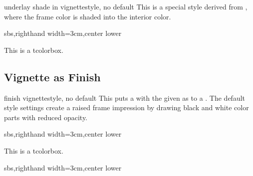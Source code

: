\begin{docTcbKey}[][doc new=2016-04-22]{underlay shade in vignette}{}{style, no default}
  This is a special style derived from ,
  where the frame color is shaded into the interior color.
\begin{dispExample*}{sbs,righthand width=3cm,center lower}
\begin{tcolorbox}[enhanced,sharp corners,frame hidden,
  colback=green!10,
  colframe=green!50!black,
  size=small,boxrule=2mm,titlerule=0mm,
  underlay shade in vignette]
    This is a tcolorbox.
\end{tcolorbox}
\end{dispExample*}
\end{docTcbKey}


\clearpage
\subsection{Vignette as Finish}\label{subsec:vignettefinish}


\begin{docTcbKey}[][doc new=2016-04-22]{finish vignette}{}{style, no default}
  This puts a  with the given 
  as  to a .
  The default style settings create a raised frame impression by
  drawing black and white color parts with reduced opacity.

\begin{dispExample*}{sbs,righthand width=3cm,center lower}
\begin{tcolorbox}[enhanced,size=small,
  colback=green!10,colframe=green!50!black,
  boxrule=0.5mm,titlerule=0mm,
  title=My title,center title,fonttitle=\bfseries,
  finish vignette={size=1mm}]
    This is a tcolorbox.
\end{tcolorbox}
\end{dispExample*}

\begin{dispExample*}{sbs,righthand width=3cm,center lower}
\end{dispExample*}
\end{docTcbKey}



